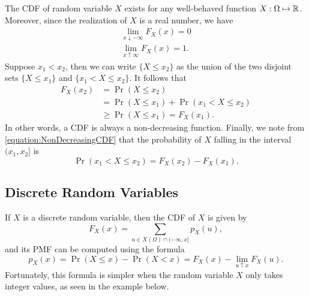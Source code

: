 The CDF of random variable $X$ exists for any well-behaved function $X : \Omega \mapsto \mathbb{R}$.
Moreover, since the realization of $X$ is a real number, we have
\begin{gather*}
\lim_{x \downarrow - \infty} F_X (x) = 0 \\
\lim_{x \uparrow \infty} F_X (x) = 1.
\end{gather*}
Suppose $x_1 < x_2$, then we can write $\{ X \leq x_2 \}$ as the union of the two disjoint sets $\{ X \leq x_1 \}$ and $\{ x_1 < X \leq x_2 \}$.
It follows that
\begin{equation} \label{equation:NonDecreasingCDF}
\begin{split}
F_X (x_2) &= \Pr (X \leq x_2) \\
&= \Pr (X \leq x_1) + \Pr (x_1 < X \leq x_2) \\
&\geq \Pr (X \leq x_1) = F_X (x_1).
\end{split}
\end{equation}
In other words, a CDF is always a non-decreasing function.
Finally, we note from \eqref{equation:NonDecreasingCDF} that the probability of $X$ falling in the interval $(x_1, x_2]$ is
\begin{equation} \label{equation:IntervalCDF}
\Pr (x_1 < X \leq x_2) = F_X (x_2) - F_X (x_1).
\end{equation}


\subsection{Discrete Random Variables}

If $X$ is a discrete random variable, then the CDF of $X$ is given by
\begin{equation*}
F_X (x) = \sum_{u \in X(\Omega) \cap (-\infty, x]} p_X (u),
\end{equation*}
and its PMF can be computed using the formula
\begin{equation*}
p_X (x) = \Pr (X \leq x) - \Pr (X < x) = F_X (x) - \lim_{u \uparrow x} F_X (u).
\end{equation*}
Fortunately, this formula is simpler when the random variable $X$ only takes integer values, as seen in the example below.

